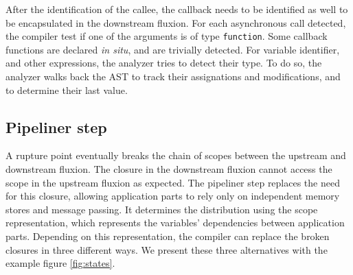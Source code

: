 After the identification of the callee, the callback needs to be identified as well to be encapsulated in the downstream fluxion.
For each asynchronous call detected, the compiler test if one of the arguments is of type \texttt{function}.
Some callback functions are declared \textit{in situ}, and are trivially detected.
For variable identifier, and other expressions, the analyzer tries to detect their type.
To do so, the analyzer walks back the AST to track their assignations and modifications, and to determine their last value.





\subsection{Pipeliner step} \label{section:compiler:pipeliner}

A rupture point eventually breaks the chain of scopes between the upstream and downstream fluxion.
The closure in the downstream fluxion cannot access the scope in the upstream fluxion as expected.
The pipeliner step replaces the need for this closure, allowing application parts to rely only on independent memory stores and message passing.
It determines the distribution using the scope representation, which represents the variables' dependencies between application parts.
Depending on this representation, the compiler can replace the broken closures in three different ways.
We present these three alternatives with the example figure \ref{fig:states}.

